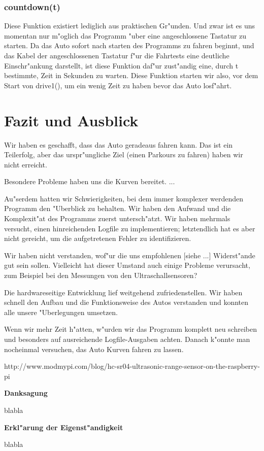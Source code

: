 \documentclass[a4paper,12pt]{article}
\begin{document}
\subsubsection{countdown(t)}\label{sec2.2.7}

Diese Funktion existiert lediglich aus praktischen Gr"unden.
Und zwar ist es uns momentan nur m"oglich das Programm "uber eine angeschlossene Tastatur zu starten.
Da das Auto sofort nach starten des Programms zu fahren beginnt, und das Kabel der angeschlossenen Tastatur f"ur die Fahrtests eine deutliche Einschr"ankung darstellt, ist diese Funktion daf"ur zust"andig eine, durch t bestimmte, Zeit in Sekunden zu warten.
Diese Funktion starten wir also, vor dem Start von drive1(), um ein wenig Zeit zu haben bevor das Auto losf"ahrt.

\section{Fazit und Ausblick}\label{sec3}

Wir haben es geschafft, dass das Auto geradeaus fahren kann.
Das ist ein Teilerfolg, aber das urspr"ungliche Ziel (einen Parkours zu fahren) haben wir nicht erreicht.

Besondere Probleme haben uns die Kurven bereitet. ...

Au"serdem hatten wir Schwierigkeiten, bei dem immer komplexer werdenden Programm den "Uberblick zu behalten.
Wir haben den Aufwand und die Komplexit"at des Programms zuerst untersch"atzt.
Wir haben mehrmals versucht, einen hinreichenden Logfile zu implementieren; letztendlich hat es aber nicht gereicht, um die aufgetretenen Fehler zu identifizieren.

Wir haben nicht verstanden, wof"ur die uns empfohlenen [siehe ...] Widerst"ande gut sein sollen.
Vielleicht hat dieser Umstand auch einige Probleme verursacht, zum Beispiel bei den Messungen von den Ultraschallsensoren?

Die hardwareseitige Entwicklung lief weitgehend zufriedenstellen.
Wir haben schnell den Aufbau und die Funktionsweise des Autos verstanden und konnten alle unsere "Uberlegungen umsetzen.

Wenn wir mehr Zeit h"atten, w"urden wir das Programm komplett neu schreiben und besonders auf ausreichende Logfile-Ausgaben achten.
Danach k"onnte man nocheinmal versuchen, das Auto Kurven fahren zu lassen.

\bigskip


\begin{thebibliography}{99}
	\itemsep-2pt \small
	 http://www.modmypi.com/blog/hc-sr04-ultrasonic-range-sensor-on-the-raspberry-pi
\end{thebibliography}

\newpage


{\large\bf Danksagung}

\medskip

blabla

\bigskip


{\large\bf Erkl"arung der Eigenst"andigkeit}

\medskip

blabla
\end{document}
